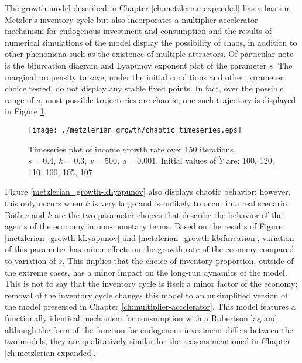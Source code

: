 The growth model described in Chapter \ref{ch:metzlerian-expanded} has a basis in Metzler's inventory cycle but also incorporates a multiplier-accelerator mechanism for endogenous investment and consumption and the results of numerical simulations of the model display the possibility of chaos, in addition to other phenomena such as the existence of multiple attractors. Of particular note is the bifurcation diagram and Lyapunov exponent plot of the parameter $s$. The marginal propensity to save, under the initial conditions and other parameter choice tested, do not display any stable fixed points. In fact, over the possible range of $s$, most possible trajectories are chaotic; one such trajectory is displayed in Figure \ref{growth_chaotic-timeseries}.
\begin{figure}
    \centering
    \texttt{[image: ./metzlerian\_growth/chaotic\_timeseries.eps]}
    \caption{Timeseries plot of income growth rate over 150 iterations. $s=0.4,\ k=0.3,\ v=500,\ q=0.001$. Initial values of $\dot Y$ are: 100, 120, 110, 100, 105, 107}
    \label{growth_chaotic-timeseries}
\end{figure}
Figure \ref{metzlerian_growth-kLyapunov} also displays chaotic behavior; however, this only occurs when $k$ is very large and is unlikely to occur in a real scenario. Both $s$ and $k$ are the two parameter choices that describe the behavior of the agents of the economy in non-monetary terms. Based on the results of Figure \ref{metzlerian_growth-kLyapunov} and \ref{metzlerian_growth-kbifurcation}, variation of this parameter has minor effects on the growth rate of the economy compared to variation of $s$. This implies that the choice of inventory proportion, outside of the extreme cases, has a minor impact on the long-run dynamics of the model. This is not to say that the inventory cycle is itself a minor factor of the economy; removal of the inventory cycle changes this model to an unsimplified version of the model presented in Chapter \ref{ch:multiplier-accelerator}. This model features a functionally identical mechanism for consumption with a Robertson lag and although the form of the function for endogenous investment differs between the two models, they are qualitatively similar for the reasons mentioned in Chapter \ref{ch:metzlerian-expanded}.

